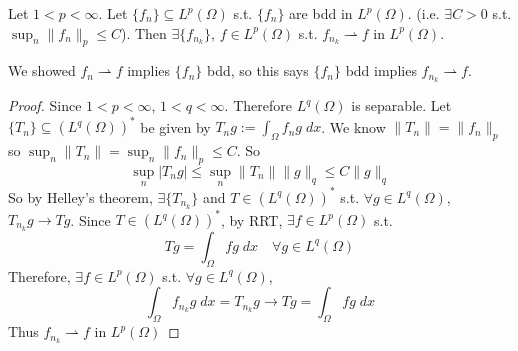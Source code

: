 \begin{thm}
    Let $1 < p < \infty$. Let $\{f_n \} \subseteq L^p(\Omega)$ s.t. $\{f_n \}$ are bdd
    in $L^p(\Omega)$. (i.e. $\exists C > 0$ s.t. $\sup_{n} \| f_n \|_p \leq C$).
    Then $\exists \{f_{n_k}\}$, $f \in L^p(\Omega)$ s.t. $f_{n_k} \rightharpoonup f$ in $L^p(\Omega)$.
\end{thm}
\begin{rem}
    We showed $f_n \rightharpoonup f$ implies $\{f_n\}$ bdd, so this says $\{f_n\}$ bdd implies $f_{n_k} \rightharpoonup f$.    
\end{rem}
\begin{proof}
    Since $1 < p < \infty$, $1 < q < \infty$. Therefore $L^q(\Omega)$ is separable. 
    Let $\{T_n\} \subseteq (L^q(\Omega))^*$ be given by $T_n g := \int_{\Omega} f_n g \; dx$.
    We know $\| T_n \| = \| f_n \|_p$ so $\sup_n \| T_n \| = \sup_n \| f_n \|_p \leq C$.
    So
    \[
        \sup_n |T_n g| \leq \sup_n \| T_n \| \| g \|_q \leq C \| g \|_q 
    \]         
    So by Helley's theorem, $\exists \{T_{n_k}\}$ and $T \in (L^q(\Omega))^*$ s.t.
    $\forall g \in L^q(\Omega)$, $T_{n_k} g \to T g$.
    Since $T \in (L^q(\Omega))^*$, by RRT, $\exists f \in L^p(\Omega)$ s.t. 
    \[
        T g = \int_{\Omega} f g \; dx \quad \forall g \in L^q(\Omega)
    \]
    Therefore, $\exists f \in L^p(\Omega)$ s.t. $\forall g \in L^q(\Omega)$,
    \[
        \int_{\Omega} f_{n_k} g \; dx = T_{n_k} g \to T g = \int_{\Omega} f g \; dx
    \]         
    Thus $f_{n_k} \rightharpoonup f$ in $L^p(\Omega)$ \qedhere
\end{proof}

